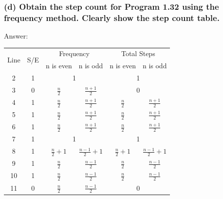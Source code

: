 \documentclass[a4paper]{article}
\begin{document}
\subsubsection*{(d) Obtain the step count for Program 1.32 using the frequency method. Clearly show the step count table. }
Answer:
\begin{table}[htbp]
\centering
\begin{tabular}{|c|c|c|c|c|c|}
    \hline
    \multirow{2}{*}{Line} & \multirow{2}{*}{S/E} & \multicolumn{2}{c|}{Frequency} & \multicolumn{2}{c|}{Total Steps} \\ \cline{3-6}
                       &                      & n is even           & n is odd          & n is even            & n is odd           \\
    \hline
    2 & 1 & \multicolumn{2}{c|}{1} & \multicolumn{2}{c|}{1} \\
    \hline
    3 & 0 & $\frac{n}{2}$ & $\frac{n+1}{2}$ & \multicolumn{2}{c|}{0}\\
    \hline
    4 & 1 & $\frac{n}{2}$ & $\frac{n+1}{2}$ & $\frac{n}{2}$ & $\frac{n+1}{2}$\\
    \hline
    5 & 1 & $\frac{n}{2}$ & $\frac{n+1}{2}$ & $\frac{n}{2}$ & $\frac{n+1}{2}$\\
    \hline
    6 & 1 & $\frac{n}{2}$ & $\frac{n+1}{2}$ & $\frac{n}{2}$ & $\frac{n+1}{2}$\\
    \hline
    7 & 1 & \multicolumn{2}{c|}{1} & \multicolumn{2}{c|}{1} \\
    \hline
    8 & 1 & $\frac{n}{2} + 1$ & $\frac{n-1}{2} + 1$ & $\frac{n}{2}+1$ & $\frac{n-1}{2}+1$\\
    \hline
    9 & 1 & $\frac{n}{2}$ & $\frac{n-1}{2}$ & $\frac{n}{2}$ & $\frac{n-1}{2}$\\
    \hline
    10 & 1 & $\frac{n}{2}$ & $\frac{n-1}{2}$ & $\frac{n}{2}$ & $\frac{n-1}{2}$\\
    \hline
    11 & 0 & $\frac{n}{2}$ & $\frac{n-1}{2}$ & \multicolumn{2}{c|}{0}\\
    \hline
    \end{tabular}
\end{table}
\newpage
\end{document}
